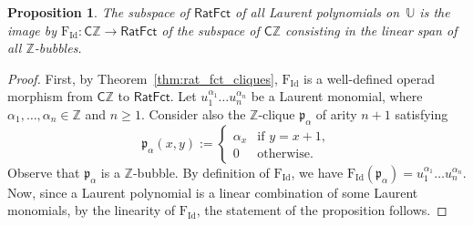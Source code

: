 \documentclass[10pt,reqno]{amsart}
\numberwithin{equation}{subsection}
\renewcommand{\geq}{\geqslant}
\newtheorem{Proposition}[Theorem]{Proposition}
\newcommand{\Z}{\mathbb{Z}}
\newcommand{\Ubb}{\mathbb{U}}
\newcommand{\Pfr}{\mathfrak{p}}
\newcommand{\Cli}{\mathsf{C}}
\newcommand{\RatFct}{\mathsf{RatFct}}
\newcommand{\Id}{\mathrm{Id}}
\newcommand{\Frac}{\mathrm{F}}
\begin{document}
\medskip

\begin{Proposition} \label{prop:rat_fct_cliques_map_Laurent_polynomials}
    The subspace of $\RatFct$ of all Laurent polynomials on~$\Ubb$ is
    the image by $\Frac_\Id : \Cli\Z \to \RatFct$ of the subspace of
    $\Cli\Z$ consisting in the linear span of all $\Z$-bubbles.
\end{Proposition}
\begin{proof}
    First, by Theorem~\ref{thm:rat_fct_cliques}, $\Frac_\Id$ is a
    well-defined operad morphism from $\Cli\Z$ to $\RatFct$. Let
    $u_1^{\alpha_1} \dots u_n^{\alpha_n}$ be a Laurent monomial, where
    $\alpha_1, \dots, \alpha_n \in \Z$ and $n \geq 1$. Consider also the
    $\Z$-clique $\Pfr_\alpha$ of arity $n + 1$ satisfying
    \begin{equation}
        \Pfr_\alpha(x, y) :=
        \begin{cases}
            \alpha_x & \mbox{if } y = x + 1, \\
            0 & \mbox{otherwise}.
        \end{cases}
    \end{equation}
    Observe that $\Pfr_\alpha$ is a $\Z$-bubble. By definition of
    $\Frac_\Id$, we have
    $\Frac_\Id(\Pfr_\alpha) = u_1^{\alpha_1} \dots u_n^{\alpha_n}$.
    Now, since a Laurent polynomial is a linear combination of some
    Laurent monomials, by the linearity of $\Frac_\Id$, the statement of
    the proposition follows.
\end{proof}
\medskip
\end{document}
